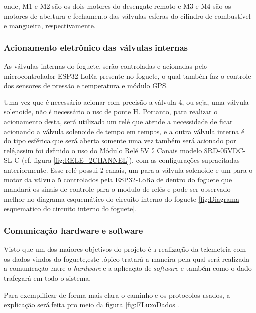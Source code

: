 onde, M1 e M2 são os dois motores do desengate remoto e M3 e M4 são os motores de abertura e fechamento das válvulas esferas do cilindro de combustível e mangueira, respectivamente.


\subsubsection{Acionamento eletrônico das válvulas internas}

\par As válvulas internas do foguete, serão controladas e acionadas pelo microcontrolador ESP32 LoRa presente no foguete, o qual também faz o controle dos sensores de pressão e temperatura e módulo GPS.
\par Uma vez que é necessário acionar com precisão a válvula 4, ou seja,  uma válvula solenoide, não é necessário o uso de ponte H. Portanto, para realizar o acionamento desta, será utilizado um relé que atende a necessidade de ficar acionando a válvula solenoide de tempo em tempos, e a outra válvula interna é do tipo esférica que será aberta somente uma vez também será acionado por relé,assim foi definido o uso do Módulo Relé 5V 2 Canais modelo SRD-05VDC-SL-C (cf. figura \ref{fig:RELE_2CHANNEL}), com as configurações supracitadas anteriormente. Esse relé possui 2 canais, um para a válvula solenoide e um para o motor da válvula 5 controlados pela ESP32-LoRa de dentro do foguete que mandará os sinais de controle para o modulo de relés e pode ser observado melhor no diagrama esquemático do circuito interno do foguete \ref{fig:Diagrama esquematico do circuito interno do foguete}.

\subsubsection{Comunicação hardware e software}

Visto que um dos maiores objetivos do projeto é a realização da telemetria com os dados vindos do foguete,este tópico tratará a maneira pela qual será realizada a comunicação entre o \textit{hardware} e a aplicação de \textit{software} e também como o dado trafegará em todo o sistema.

Para exemplificar de forma mais clara o caminho e os protocolos usados, a explicação será feita pro meio da figura \ref{fig:FLuxoDados}.

